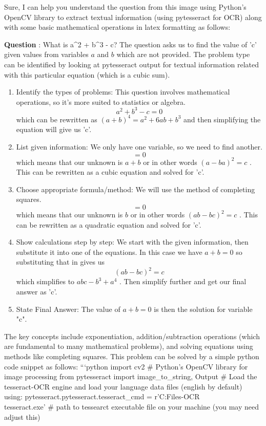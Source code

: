 Sure, I can help you understand the question from this image using Python's OpenCV library to extract textual information (using pytesseract for OCR) along with some basic mathematical operations in latex formatting as follows: 

\textbf{Question} : What is a^2 + b^3 - c?  
The question asks us to find the value of 'c' given values from variables $a$ and $b$  which are not provided. The problem type can be identified by looking at pytesseract output for textual information related with this particular equation (which is a cubic sum). 
\begin{enumerate}
    \item Identify the types of problems: This question involves mathematical operations, so it's more suited to statistics or algebra.  
    $$a^2 + b^3 - c = 0 $$ which can be rewritten as $(a+b)^4 = a^2 + 6ab + b^3$ and then simplifying the equation will give us 'c'. 
    \item List given information: We only have one variable, so we need to find another.  
    $$=0 $$ which means that our unknown is $a+b$  or in other words  $(a-ba)^2 = c$ . This can be rewritten as a cubic equation and solved for 'c'. 
    \item Choose appropriate formula/method: We will use the method of completing squares.  
    $$=0 $$ which means that our unknown is $b$  or in other words  $(ab-bc)^2 = c$ . This can be rewritten as a quadratic equation and solved for 'c'. 
    \item Show calculations step by step: We start with the given information, then substitute it into one of the equations. In this case we have $a+b = 0$  so substituting that in gives us $$(ab-bc)^2 = c$$ which simplifies to  $abc - b^3 + a^4$ . Then simplify further and get our final answer as 'c'. 
    \item State Final Answer: The value of $a+b = 0$  is then the solution for variable "c".  
\end{enumerate}
The key concepts include exponentiation, addition/subtraction operations (which are fundamental to many mathematical problems), and solving equations using methods like completing squares.  This problem can be solved by a simple python code snippet as follows:   
```python    
import cv2   # Python's OpenCV library for image processing
from pytesseract import image_to_string, Output
# Load the tesseract-OCR engine and load your language data files  (english by default) using:   
pytesseract.pytesseract.tesseract_cmd = r'C:\Program Files\Tesseract-OCR\\tesseract.exe'   # path to tessearct executable file on your machine  (you may need adjust this)
